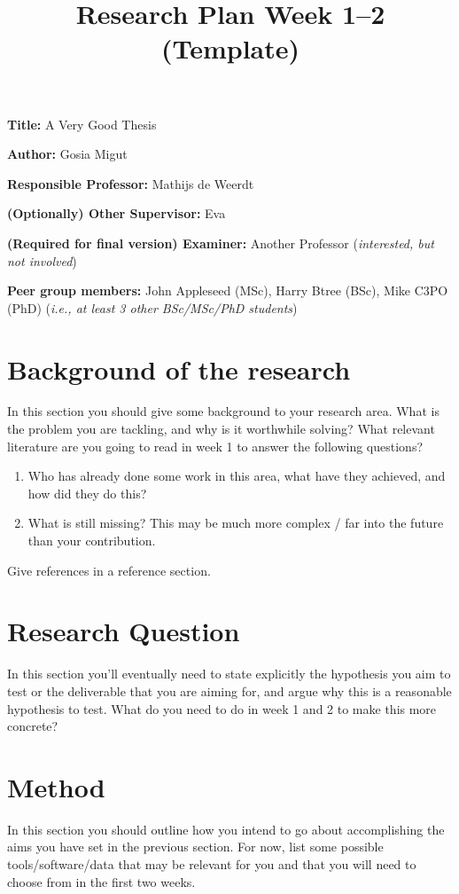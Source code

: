 \documentclass[english]{article}
\title{Research Plan Week 1--2 (Template)}
\author{}
\date{}
\newcommand{\namelistlabel}[1]{\mbox{#1}\hfil}
\newenvironment{namelist}[1]{%
\begin{list}{}
    {
        \let\makelabel\namelistlabel
        \settowidth{\labelwidth}{#1}
        \setlength{\leftmargin}{1.1\labelwidth}
    }
  }{%
\end{list}}
\begin{document}
\maketitle

\begin{namelist}{xxxxxxxxxxxxxxxxxxxxxxxxxxxxxxxxxxxxxxx}
\item[{\bf Title:}]
	A Very Good Thesis
\item[{\bf Author:}]
	Gosia Migut
\item[{\bf Responsible Professor:}]
	Mathijs de Weerdt
\item[{\bf (Optionally) Other Supervisor:}]
	Eva
\item[{\bf (Required for final version) Examiner:}]
	Another Professor (\emph{interested, but not involved})
\item[{\bf Peer group members:}]
	John Appleseed (MSc), Harry Btree (BSc), Mike C3PO (PhD)
(\emph{i.e., at least 3 other BSc/MSc/PhD students})
\end{namelist}


\section*{Background of the research}
In this section you should give some background to your research area. 
What is the problem you are tackling, and why is it worthwhile solving? 
What relevant literature are you going to read in week 1 to answer the following questions?
\begin{enumerate}
\item Who has already done some work in this area, what have they achieved, and how did they do this?
\item What is still missing? This may be much more complex / far into the future than your contribution.
\end{enumerate}
Give references in a reference section.

\section*{Research Question}
In this section you'll eventually need to state explicitly the hypothesis you aim to test or the deliverable that you are aiming for, and argue why this is a reasonable hypothesis to test.
What do you need to do in week 1 and 2 to make this more concrete?

\section*{Method}
In this section you should outline how you intend to go about accomplishing the aims you have set in the previous section. 
For now, list some possible tools/software/data that may be relevant for you and that you will need to choose from in the first two weeks.
\end{document}
